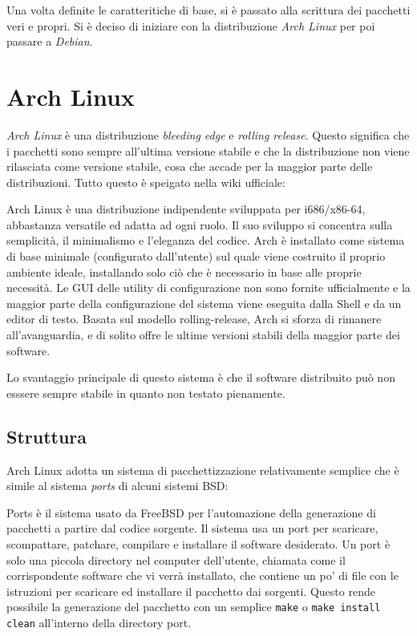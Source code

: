 \documentclass[10pt,titlepage,twoside,a4paper]{report}
\begin{document}
Una volta definite le caratteritiche di base, si è passato alla scrittura dei
pacchetti veri e propri. Si è deciso di iniziare con la
distribuzione \emph{Arch Linux} per poi passare a \emph{Debian}.


\section{Arch Linux}
\emph{Arch Linux} è una distribuzione \emph{bleeding edge} e \emph{rolling 
release}. Questo significa che i pacchetti sono sempre all'ultima versione 
stabile e che la distribuzione non viene rilasciata come versione stabile, 
cosa che accade per la maggior parte delle distribuzioni. Tutto questo è 
speigato nella wiki ufficiale\cite{archLinux}:
\begin{displayquote}
Arch Linux è una distribuzione indipendente sviluppata per i686/x86-64, 
abbastanza versatile ed adatta ad ogni ruolo. Il suo sviluppo si concentra 
sulla semplicità, il minimalismo e l'eleganza del codice. Arch è installato 
come sistema di base minimale (configurato dall'utente) sul quale viene 
costruito il proprio ambiente ideale, installando solo ciò che è necessario 
in base alle proprie necessità. Le GUI delle utility di configurazione non 
sono fornite ufficialmente e la maggior parte della configurazione del sistema viene 
eseguita dalla Shell e da un editor di testo. Basata sul modello 
rolling-release, Arch si sforza di rimanere all'avanguardia, e di solito offre 
le ultime versioni stabili della maggior parte dei software.
\end{displayquote}
Lo svantaggio principale di questo sistema è che il software distribuito 
può non esssere sempre stabile in quanto non testato pienamente.

\subsection{Struttura}
Arch Linux adotta un sistema di pacchettizzazione relativamente semplice 
che è simile al sistema \emph{ports} di alcuni sistemi 
BSD\cite{portsLikeSystem}:
\begin{displayquote}
Ports è il sistema usato da FreeBSD per l'automazione della generazione di 
pacchetti a partire dal codice sorgente. Il sistema usa un port per scaricare, 
scompattare, patchare, compilare e installare il software desiderato. Un port 
è solo una piccola directory nel computer dell'utente, chiamata come il 
corrispondente software che vi verrà installato, che contiene un po' di file 
con le istruzioni per scaricare ed installare il pacchetto dai sorgenti. Questo 
rende possibile la generazione del pacchetto con un semplice \texttt{make} o 
\texttt{make install clean} all'interno della directory port.
\end{displayquote}
\end{document}
